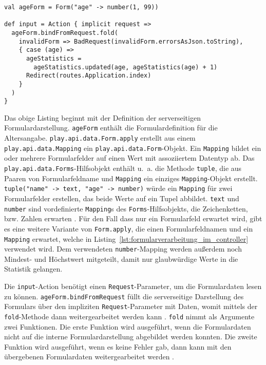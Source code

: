 \begin{lstlisting}[caption=Formularverarbeitung im Controller, label=lst:formularverarbeitung_im_controller]
val ageForm = Form("age" -> number(1, 99))

def input = Action { implicit request =>
  ageForm.bindFromRequest.fold(
    invalidForm => BadRequest(invalidForm.errorsAsJson.toString),
    { case (age) =>
      ageStatistics =
        ageStatistics.updated(age, ageStatistics(age) + 1)
      Redirect(routes.Application.index)
    }
  )
}
\end{lstlisting}

Das obige Listing beginnt mit der Definition der serverseitigen Formulardarstellung.
\lstinline|ageForm| enthält die Formulardefinition für die Altersangabe.
\lstinline|play.api.data.Form.apply| erstellt aus einem \lstinline|play.api.data.Mapping| ein \lstinline|play.api.data.Form|-Objekt.
Ein \lstinline|Mapping| bildet ein oder mehrere Formularfelder auf einen Wert mit assoziiertem Datentyp ab.
Das \lstinline|play.api.data.Forms|-Hilfsobjekt enthält u.~a. die Methode \lstinline|tuple|, die aus Paaren von Formularfeldname und \lstinline|Mapping| ein einziges \lstinline|Mapping|-Objekt erstellt.
\lstinline|tuple("name" -> text, "age" -> number)| würde ein \lstinline|Mapping| für zwei Formularfelder erstellen, das beide Werte auf ein Tupel abbildet.
\lstinline|text| und \lstinline|number| sind vordefinierte \lstinline|Mapping|s des \lstinline|Forms|-Hilfsobjekts, die Zeichenketten, bzw. Zahlen erwarten \cite[vgl.][S~174--175]{play_for_scala}.
Für den Fall dass nur ein Formularfeld erwartet wird, gibt es eine weitere Variante von \lstinline|Form.apply|, die einen Formularfeldnamen und ein \lstinline|Mapping| erwartet, welche in Listing~\ref{lst:formularverarbeitung_im_controller} verwendet wird.
Dem verwendeten \lstinline|number|-Mapping werden außerdem noch Mindest- und Höchstwert mitgeteilt, damit nur glaubwürdige Werte in die Statistik gelangen.

Die \lstinline|input|-Action benötigt einen \lstinline|Request|-Parameter, um die Formulardaten lesen zu können.
\lstinline|ageForm.bindFromRequest| füllt die serverseitige Darstellung des Formulars über den impliziten \lstinline|Request|-Parameter mit Daten, womit mittels der \lstinline|fold|-Methode dann weitergearbeitet werden kann \cite[vgl.][S.~179]{play_for_scala}.
\lstinline|fold| nimmt als Argumente zwei Funktionen.
Die erste Funktion wird ausgeführt, wenn die Formulardaten nicht auf die interne Formulardarstellung abgebildet werden konnten.
Die zweite Funktion wird ausgeführt, wenn es keine Fehler gab, dann kann mit den übergebenen Formulardaten weitergearbeitet werden \cite[vgl.][S.~176]{play_for_scala}.

